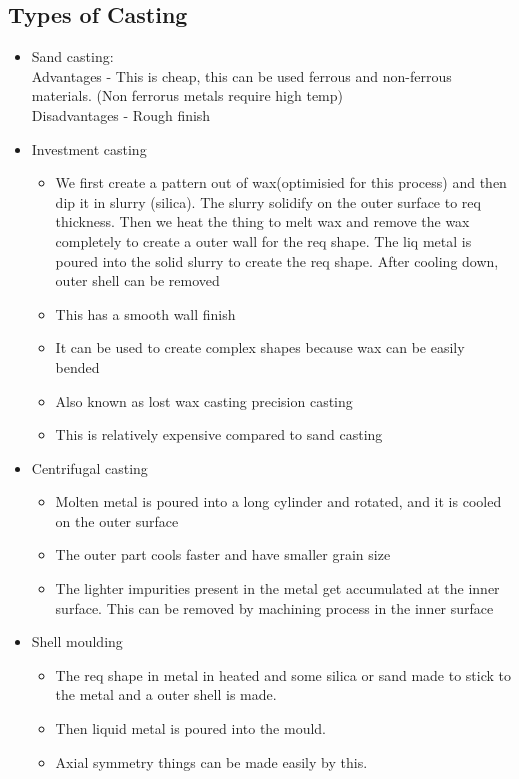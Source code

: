 \documentclass{article}
\begin{document}
\subsection{Types of Casting}

\begin{itemize}
	\item Sand casting:\\
		Advantages - This is cheap, this can be used ferrous and non-ferrous materials. (Non ferrorus metals require high temp)\\
		Disadvantages - Rough finish

	\item Investment casting
		\begin{itemize}
			\item We first create a pattern out of wax(optimisied for this process)  and then dip it in slurry (silica). The slurry solidify on the outer surface to req thickness. Then we heat the thing to melt wax and remove the wax completely to create a outer wall for the req shape. The liq metal is poured into the solid slurry to create the req shape. After cooling down, outer shell can be removed
			\item This has a smooth wall finish
			\item It can be used to create complex shapes because wax can be easily bended 
			\item Also known as lost wax casting precision casting
			\item This is relatively expensive compared to sand casting
		\end{itemize}


\item Centrifugal casting
	\begin{itemize}
	\item Molten metal is poured into a long cylinder and rotated, and it is cooled on the outer surface
	\item The outer part cools faster and have smaller grain size
	\item The lighter impurities present in the metal get accumulated at the inner surface. This can be removed by machining process in the inner surface
	\end{itemize}

	
\item Shell moulding
	\begin{itemize}
	\item The req shape in metal in heated and some silica or sand made to stick to the metal and a outer shell is made.
	\item Then liquid metal is poured into the mould.
	\item Axial symmetry things can be made easily by this.
	\end{itemize}



\end{itemize}
\end{document}
